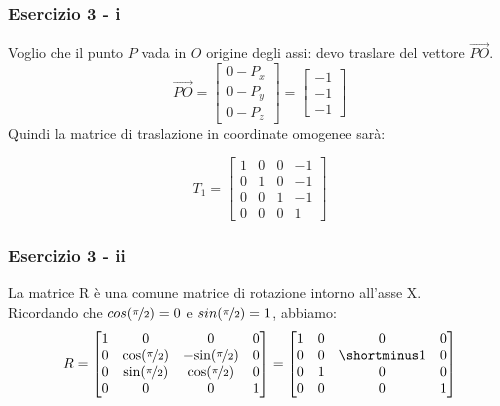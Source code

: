 \documentclass{beamer}
\begin{document}
\begin{frame}
\frametitle{Esercizio 3 - i}
Voglio che il punto $P$ vada in $O$ origine degli assi: devo traslare del vettore
$\overrightarrow{PO}$.
\begin{displaymath}
    \overrightarrow{PO}
    = 
\begin{bmatrix}
        0 - P_x\\
        0 - P_y\\
        0 - P_z
\end{bmatrix}
    = 
\begin{bmatrix}
        - 1\\
        - 1\\
        - 1
\end{bmatrix}
\end{displaymath}
Quindi la matrice di traslazione in coordinate omogenee sar\`a:

\begin{displaymath}
T_1 = 
\begin{bmatrix}
        1 & 0 & 0 & -1\\
        0 & 1 & 0 & -1\\
        0 & 0 & 1 & -1\\
        0 & 0 & 0 & 1 
\end{bmatrix}
\end{displaymath}
\end{frame}

\begin{frame}
\frametitle{Esercizio 3 - ii}
La matrice R \`e una comune matrice di rotazione intorno all'asse X. \\
Ricordando che $cos(\nicefrac{\pi}{2}) = 0$ e $sin(\nicefrac{\pi}{2}) = 1$, abbiamo:
\begin{displaymath}
R
= 
\begin{bmatrix}
    1 & 0 & 0 & 0 \\
    0 &\mbox{cos}(\nicefrac{\pi}{2}) & -\mbox{sin}(\nicefrac{\pi}{2}) & 0\\
    0 &\mbox{sin}(\nicefrac{\pi}{2}) & \mbox{cos}(\nicefrac{\pi}{2})  & 0\\ 
    0 & 0 & 0 & 1
\end{bmatrix}
= 
\begin{bmatrix}
    1 & 0 & 0 & 0 \\
    0 & 0 & \shortminus 1 & 0\\
    0 & 1 & 0 & 0\\ 
    0 & 0 & 0 & 1
\end{bmatrix}
\end{displaymath}
\end{frame}
\end{document}
